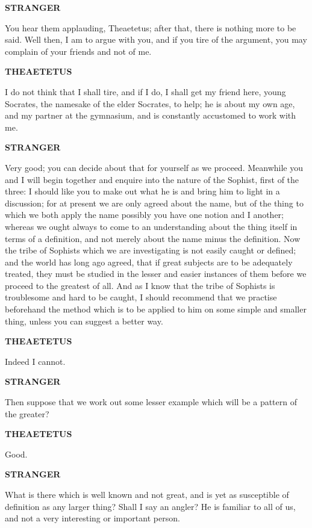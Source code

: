\documentclass[11pt,letter]{article}
\begin{document}
\par \textbf{STRANGER}
\par   You hear them applauding, Theaetetus; after that, there is nothing more to be said. Well then, I am to argue with you, and if you tire of the argument, you may complain of your friends and not of me.

\par \textbf{THEAETETUS}
\par   I do not think that I shall tire, and if I do, I shall get my friend here, young Socrates, the namesake of the elder Socrates, to help; he is about my own age, and my partner at the gymnasium, and is constantly accustomed to work with me.

\par \textbf{STRANGER}
\par   Very good; you can decide about that for yourself as we proceed. Meanwhile you and I will begin together and enquire into the nature of the Sophist, first of the three:  I should like you to make out what he is and bring him to light in a discussion; for at present we are only agreed about the name, but of the thing to which we both apply the name possibly you have one notion and I another; whereas we ought always to come to an understanding about the thing itself in terms of a definition, and not merely about the name minus the definition. Now the tribe of Sophists which we are investigating is not easily caught or defined; and the world has long ago agreed, that if great subjects are to be adequately treated, they must be studied in the lesser and easier instances of them before we proceed to the greatest of all. And as I know that the tribe of Sophists is troublesome and hard to be caught, I should recommend that we practise beforehand the method which is to be applied to him on some simple and smaller thing, unless you can suggest a better way.

\par \textbf{THEAETETUS}
\par   Indeed I cannot.

\par \textbf{STRANGER}
\par   Then suppose that we work out some lesser example which will be a pattern of the greater?

\par \textbf{THEAETETUS}
\par   Good.

\par \textbf{STRANGER}
\par   What is there which is well known and not great, and is yet as susceptible of definition as any larger thing? Shall I say an angler? He is familiar to all of us, and not a very interesting or important person.
\end{document}
